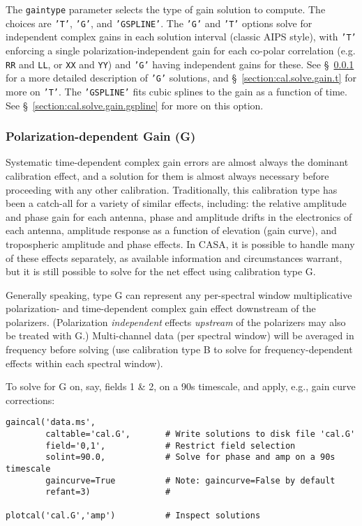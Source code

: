 The {\tt gaintype} parameter selects the type of gain solution to
compute.  The choices are {\tt 'T'}, {\tt 'G'}, and {\tt 'GSPLINE'}.
The {\tt 'G'} and {\tt 'T'} options solve for independent complex
gains in each solution interval (classic AIPS style), with {\tt 'T'} 
enforcing a single polarization-independent gain for each co-polar
correlation (e.g. {\tt RR} and {\tt LL}, or {\tt XX} and {\tt YY})
and {\tt 'G'} having independent gains for these.  
See \S~\ref{section:cal.solve.gain.g} for a more detailed description
of {\tt 'G'} solutions, and \S~\ref{section:cal.solve.gain.t} for more
on {\tt 'T'}.  The {\tt 'GSPLINE'} fits cubic splines to the gain as
a function of time.  See \S~\ref{section:cal.solve.gain.gspline} for
more on this option.

\subsubsection{Polarization-dependent Gain (G)}
\label{section:cal.solve.gain.g}

Systematic time-dependent complex gain errors are almost always the
dominant calibration effect, and a solution for them is almost always
necessary before proceeding with any other calibration.
Traditionally, this calibration type has been a catch-all for a
variety of similar effects, including: the relative amplitude and
phase gain for each antenna, phase and amplitude drifts in the
electronics of each antenna, amplitude response as a function of
elevation (gain curve), and tropospheric amplitude and phase effects.
In CASA, it is possible to handle many of these effects separately, as
available information and circumstances warrant, but it is still
possible to solve for the net effect using calibration type G.

Generally speaking, type G can represent any per-spectral window
multiplicative polarization- and time-dependent complex gain effect
downstream of the polarizers.  (Polarization {\it independent} effects
{\it upstream} of the polarizers may also be treated with G.)
Multi-channel data (per spectral window) will be averaged in frequency
before solving (use calibration type B to solve for
frequency-dependent effects within each spectral window).

To solve for G on, say, fields 1 \& 2, on a 90s timescale, and apply,
e.g., gain curve corrections:
\small
\begin{verbatim}
gaincal('data.ms',
        caltable='cal.G',       # Write solutions to disk file 'cal.G'
        field='0,1',            # Restrict field selection
        solint=90.0,            # Solve for phase and amp on a 90s timescale
        gaincurve=True          # Note: gaincurve=False by default
        refant=3)               #
			        
plotcal('cal.G','amp')          # Inspect solutions
\end{verbatim}
\normalsize

